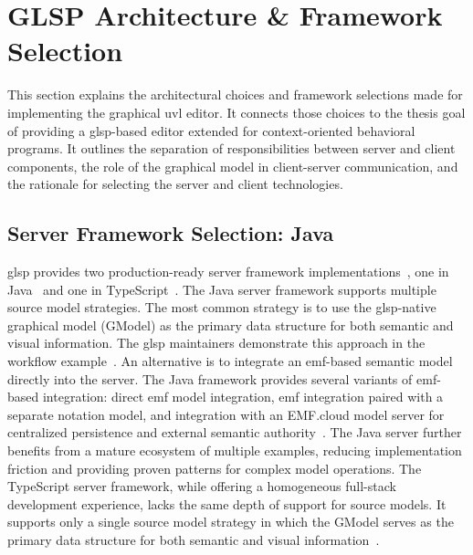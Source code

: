 \section{GLSP Architecture \& Framework Selection}
\label{sec:concept_glsp}

This section explains the architectural choices and framework selections made for implementing the graphical \gls{uvl} editor.
It connects those choices to the thesis goal of providing a \gls{glsp}-based editor extended for context-oriented behavioral programs.
It outlines the separation of responsibilities between server and client components, the role of the graphical model in client-server communication, and the rationale for selecting the server and client technologies.

\subsection{Server Framework Selection: Java}
\label{subsec:concept_glsp_server}

\gls{glsp} provides two production-ready server framework implementations~\cite{bork_vision_2024}, one in Java~\cite{noauthor_eclipse-glspglsp-server_2026} and one in TypeScript~\cite{noauthor_eclipse-glspglsp-server-node_2026}.
The Java server framework supports multiple source model strategies.
The most common strategy is to use the \gls{glsp}-native graphical model (GModel) as the primary data structure for both semantic and visual information.
The \gls{glsp} maintainers demonstrate this approach in the workflow example~\cite{noauthor_eclipse-glspglsp-examples_2026}.
An alternative is to integrate an \gls{emf}-based semantic model directly into the server.
The Java framework provides several variants of \gls{emf}-based integration: direct \gls{emf} model integration, \gls{emf} integration paired with a separate notation model, and integration with an EMF.cloud model server for centralized persistence and external semantic authority~\cite{bork_vision_2024}.
The Java server further benefits from a mature ecosystem of multiple examples, reducing implementation friction and providing proven patterns for complex model operations.
The TypeScript server framework, while offering a homogeneous full-stack development experience, lacks the same depth of support for source models.
It supports only a single source model strategy in which the GModel serves as the primary data structure for both semantic and visual information~\cite{noauthor_eclipse-glspglsp-server-node_2026}.

